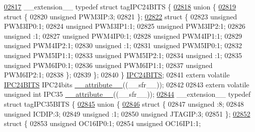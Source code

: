 \begin{DoxyCode}
\hypertarget{a00015_source_l02817}{}\hyperlink{a00014}{02817} \_\_extension\_\_ \textcolor{keyword}{typedef} \textcolor{keyword}{struct }tagIPC24BITS \{
\hypertarget{a00015_source_l02818}{}\hyperlink{a00015}{02818}   \textcolor{keyword}{union }\{
\hypertarget{a00015_source_l02819}{}\hyperlink{a00015}{02819}     \textcolor{keyword}{struct }\{
02820       \textcolor{keywordtype}{unsigned} PWM3IP:3;
02821     \};
\hypertarget{a00015_source_l02822}{}\hyperlink{a00015}{02822}     \textcolor{keyword}{struct }\{
02823       \textcolor{keywordtype}{unsigned} PWM3IP0:1;
02824       \textcolor{keywordtype}{unsigned} PWM3IP1:1;
02825       \textcolor{keywordtype}{unsigned} PWM3IP2:1;
02826       \textcolor{keywordtype}{unsigned} :1;
02827       \textcolor{keywordtype}{unsigned} PWM4IP0:1;
02828       \textcolor{keywordtype}{unsigned} PWM4IP1:1;
02829       \textcolor{keywordtype}{unsigned} PWM4IP2:1;
02830       \textcolor{keywordtype}{unsigned} :1;
02831       \textcolor{keywordtype}{unsigned} PWM5IP0:1;
02832       \textcolor{keywordtype}{unsigned} PWM5IP1:1;
02833       \textcolor{keywordtype}{unsigned} PWM5IP2:1;
02834       \textcolor{keywordtype}{unsigned} :1;
02835       \textcolor{keywordtype}{unsigned} PWM6IP0:1;
02836       \textcolor{keywordtype}{unsigned} PWM6IP1:1;
02837       \textcolor{keywordtype}{unsigned} PWM6IP2:1;
02838     \};
02839   \};
02840 \} \hyperlink{a00014_dd/d72/a00541}{IPC24BITS};
02841 \textcolor{keyword}{extern} \textcolor{keyword}{volatile} \hyperlink{a00014_dd/d72/a00541}{IPC24BITS} IPC24bits \hyperlink{a00015_a493c46f03454991ccc5aa7a6e1dfb2a7}{\_\_attribute\_\_}((\_\_sfr\_\_));
02842 
02843 \textcolor{keyword}{extern} \textcolor{keyword}{volatile} \textcolor{keywordtype}{unsigned} \textcolor{keywordtype}{int}  IPC35 \hyperlink{a00015_a493c46f03454991ccc5aa7a6e1dfb2a7}{\_\_attribute\_\_}((\_\_sfr\_\_));
\hypertarget{a00015_source_l02844}{}\hyperlink{a00014}{02844} \_\_extension\_\_ \textcolor{keyword}{typedef} \textcolor{keyword}{struct }tagIPC35BITS \{
\hypertarget{a00015_source_l02845}{}\hyperlink{a00015}{02845}   \textcolor{keyword}{union }\{
\hypertarget{a00015_source_l02846}{}\hyperlink{a00015}{02846}     \textcolor{keyword}{struct }\{
02847       \textcolor{keywordtype}{unsigned} :8;
02848       \textcolor{keywordtype}{unsigned} ICDIP:3;
02849       \textcolor{keywordtype}{unsigned} :1;
02850       \textcolor{keywordtype}{unsigned} JTAGIP:3;
02851     \};
\hypertarget{a00015_source_l02852}{}\hyperlink{a00015}{02852}     \textcolor{keyword}{struct }\{
02853       \textcolor{keywordtype}{unsigned} OC16IP0:1;
02854       \textcolor{keywordtype}{unsigned} OC16IP1:1;

\end{DoxyCode}
